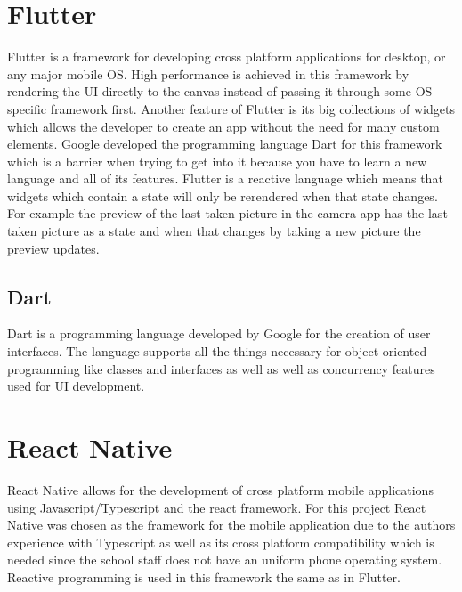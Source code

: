 \section{Flutter}

Flutter is a framework for developing cross platform applications for desktop, or any major mobile OS.
High performance is achieved in this framework by rendering the UI directly to the canvas instead of passing it through some OS specific framework first.
Another feature of Flutter is its big collections of widgets which allows the developer to create an app without the need for many custom elements.
Google developed the programming language Dart for this framework which is a barrier when trying to get into it because you have to learn a new language and all of its features.
Flutter is a reactive language which means that widgets which contain a state will only be rerendered when that state changes. For example the preview of the last taken picture in the camera app has the last taken picture as a state and when that changes by taking a new picture the preview updates.

\cite{FlutterOverview}

\subsection{Dart}

Dart is a programming language developed by Google for the creation of user interfaces. The language supports all the things necessary for object oriented programming like classes and interfaces as well as well as concurrency features used for UI development. 

\section{React Native}

React Native allows for the development of cross platform mobile applications using Javascript/Typescript and the react framework.
For this project React Native was chosen as the framework for the mobile application due to the authors experience with Typescript as well as its cross platform compatibility which is needed since the school staff does not have an uniform phone operating system.
Reactive programming is used in this framework the same as in Flutter.

\cite{reactNativeOverview}

